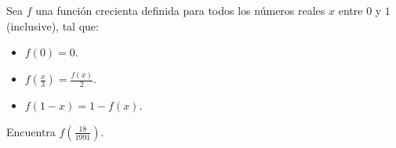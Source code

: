 Sea $f$ una función crecienta definida para todos los números reales $x$ entre $0$ y $1$ (inclusive), tal que:
 \begin{itemize} 
 \item  $f(0)=0$.
 \item  $f\left(\frac x3\right)=\frac{f(x)}{2}$.
 \item  $f(1-x)=1-f(x)$.
 \end{itemize} 
Encuentra $f\left(\frac{18}{1991}\right)$. 